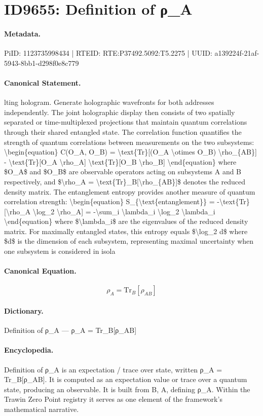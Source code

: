\section*{ID9655: Definition of ρ\_A}
\paragraph{Metadata.}
PiID: 1123735998434 | RTEID: RTE:P37492.5092:T5.2275 | UUID: a139224f-21af-5943-8bb1-d298f0e8c779

\paragraph{Canonical Statement.}
lting hologram. Generate holographic wavefronts for both addresses independently. The joint holographic display then consists of two spatially separated or time-multiplexed projections that maintain quantum correlations through their shared entangled state. The correlation function quantifies the strength of quantum correlations between measurements on the two subsystems: \textbackslash{}begin\{equation\} C(O\_A, O\_B) = \textbackslash{}text\{Tr\}[(O\_A \textbackslash{}otimes O\_B) \textbackslash{}rho\_\{AB\}] - \textbackslash{}text\{Tr\}[O\_A \textbackslash{}rho\_A] \textbackslash{}text\{Tr\}[O\_B \textbackslash{}rho\_B] \textbackslash{}end\{equation\} where \$O\_A\$ and \$O\_B\$ are observable operators acting on subsystems A and B respectively, and \$\textbackslash{}rho\_A = \textbackslash{}text\{Tr\}\_B[\textbackslash{}rho\_\{AB\}]\$ denotes the reduced density matrix. The entanglement entropy provides another measure of quantum correlation strength: \textbackslash{}begin\{equation\} S\_\{\textbackslash{}text\{entanglement\}\} = -\textbackslash{}text\{Tr\}[\textbackslash{}rho\_A \textbackslash{}log\_2 \textbackslash{}rho\_A] = -\textbackslash{}sum\_i \textbackslash{}lambda\_i \textbackslash{}log\_2 \textbackslash{}lambda\_i \textbackslash{}end\{equation\} where \$\textbackslash{}lambda\_i\$ are the eigenvalues of the reduced density matrix. For maximally entangled states, this entropy equals \$\textbackslash{}log\_2 d\$ where \$d\$ is the dimension of each subsystem, representing maximal uncertainty when one subsystem is considered in isola

\paragraph{Canonical Equation.}
\[
\rho_A = \text{Tr}_B[\rho_{AB}]
\]

\paragraph{Dictionary.}
Definition of ρ\_A — ρ\_A = Tr\_B[ρ\_AB]

\paragraph{Encyclopedia.}
Definition of ρ\_A is an expectation / trace over state, written ρ\_A = Tr\_B[ρ\_AB]. It is computed as an expectation value or trace over a quantum state, producing an observable. It is built from B, A, defining ρ\_A. Within the Trawin Zero Point registry it serves as one element of the framework's mathematical narrative.
